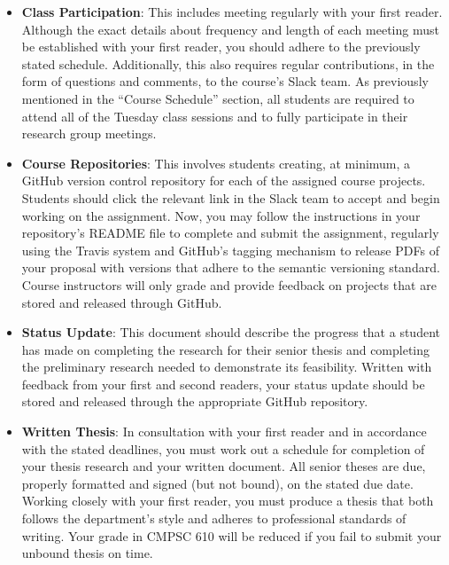 \documentclass[11pt]{article}
\begin{document}
\begin{itemize}

  \item {\bf Class Participation}: This includes meeting regularly with your
    first reader. Although the exact details about frequency and length of each
    meeting must be established with your first reader, you should adhere to the
    previously stated schedule. Additionally, this also requires regular
    contributions, in the form of questions and comments, to the course's Slack
    team. As previously mentioned in the ``Course Schedule'' section, all
    students are required to attend all of the Tuesday class sessions and to
    fully participate in their research group meetings.

  \item {\bf Course Repositories}: This involves students creating, at minimum,
    a GitHub version control repository for each of the assigned course
    projects. Students should click the relevant link in the Slack team to
    accept and begin working on the assignment. Now, you may follow the
    instructions in your repository's README file to complete and submit the
    assignment, regularly using the Travis system and GitHub's tagging mechanism
    to release PDFs of your proposal with versions that adhere to the semantic
    versioning standard. Course instructors will only grade and provide feedback
    on projects that are stored and released through GitHub.

  \item {\bf Status Update}: This document should describe the progress that a
    student has made on completing the research for their senior thesis and
    completing the preliminary research needed to demonstrate its feasibility.
    Written with feedback from your first and second readers, your status update
    should be stored and released through the appropriate GitHub repository.

  \item {\bf Written Thesis}: In consultation with your first reader and in
    accordance with the stated deadlines, you must work out a schedule for
    completion of your thesis research and your written document. All senior
    theses are due, properly formatted and signed (but not bound), on the
    stated due date.  Working closely with your first reader, you must produce
    a thesis that both follows the department's style and adheres to
    professional standards of writing. Your grade in CMPSC 610 will be reduced
    if you fail to submit your unbound thesis on time.


\end{itemize}
\end{document}
